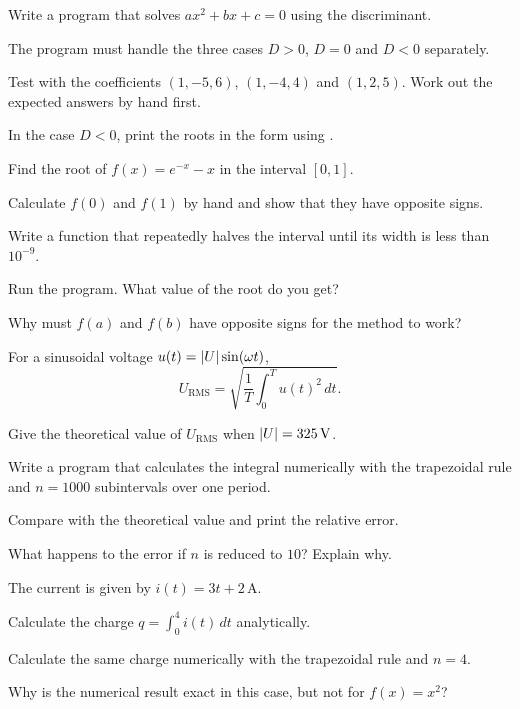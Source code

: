 \begin{parts}
  \item Write a program that solves $ax^2 + bx + c = 0$ using the discriminant.
  \item The program must handle the three cases $D > 0$, $D = 0$ and $D < 0$ separately.
  \item Test with the coefficients $(1, -5, 6)$, $(1, -4, 4)$ and $(1, 2, 5)$. Work out the
    expected answers by hand first.
  \item In the case $D < 0$, print the roots in the form  using .
\end{parts}

Find the root of $f(x) = e^{-x} - x$ in the interval $[0, 1]$.
\begin{parts}
  \item Calculate $f(0)$ and $f(1)$ by hand and show that they have opposite signs.
  \item Write a function  that repeatedly halves the interval until its width is
    less than $10^{-9}$.
  \item Run the program. What value of the root do you get?
  \item Why must $f(a)$ and $f(b)$ have opposite signs for the method to work?
\end{parts}

For a sinusoidal voltage $u(t) = \lvert U\rvert\sin(\omega t)$,
\[
  U_{\text{RMS}} = \sqrt{\frac{1}{T}\int_0^T u(t)^2\,dt}.
\]
\begin{parts}
  \item Give the theoretical value of $U_{\text{RMS}}$ when $\lvert U\rvert = 325\,\text{V}$.
  \item Write a program that calculates the integral numerically with the trapezoidal rule and
    $n = 1000$ subintervals over one period.
  \item Compare with the theoretical value and print the relative error.
  \item What happens to the error if $n$ is reduced to $10$? Explain why.
\end{parts}

The current is given by $i(t) = 3t + 2\,\text{A}$.
\begin{parts}
  \item Calculate the charge $q = \int_0^4 i(t)\,dt$ analytically.
  \item Calculate the same charge numerically with the trapezoidal rule and $n = 4$.
  \item Why is the numerical result exact in this case, but not for $f(x) = x^2$?
\end{parts}

